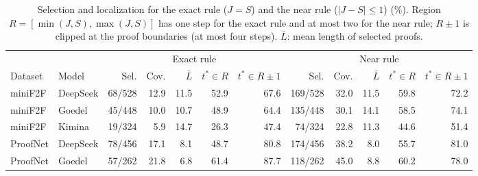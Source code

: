 \begin{table}[h]
\caption{Selection and localization for the exact rule ($J=S$) and the near rule ($|J-S|\le1$) (\%). Region $R=[\min(J,S),\max(J,S)]$ has one step for the exact rule and at most two for the near rule; $R\pm1$ is clipped at the proof boundaries (at most four steps). $\bar L$: mean length of selected proofs.}
\label{tab:selection}
\begin{center}
\footnotesize
\setlength{\tabcolsep}{3.5pt}
\begin{tabular}{llrrrrrrrrrr}
\toprule
& & \multicolumn{5}{c}{Exact rule} & \multicolumn{5}{c}{Near rule}\\
\cmidrule(lr){3-7}\cmidrule(lr){8-12}
Dataset & Model & Sel. & Cov. & $\bar L$ & $t^*\!\in\!R$ & $t^*\!\in\!R\pm1$ & Sel. & Cov. & $\bar L$ & $t^*\!\in\!R$ & $t^*\!\in\!R\pm1$\\
\midrule
miniF2F & DeepSeek & 68/528 & 12.9 & 11.5 & 52.9 & 67.6 & 169/528 & 32.0 & 11.5 & 59.8 & 72.2\\
miniF2F & Goedel & 45/448 & 10.0 & 10.7 & 48.9 & 64.4 & 135/448 & 30.1 & 14.1 & 58.5 & 74.1\\
miniF2F & Kimina & 19/324 & 5.9 & 14.7 & 26.3 & 47.4 & 74/324 & 22.8 & 11.3 & 44.6 & 51.4\\
ProofNet & DeepSeek & 78/456 & 17.1 & 8.1 & 48.7 & 80.8 & 174/456 & 38.2 & 8.0 & 55.7 & 81.0\\
ProofNet & Goedel & 57/262 & 21.8 & 6.8 & 61.4 & 87.7 & 118/262 & 45.0 & 8.8 & 60.2 & 78.0\\
\bottomrule
\end{tabular}
\end{center}
\end{table}

